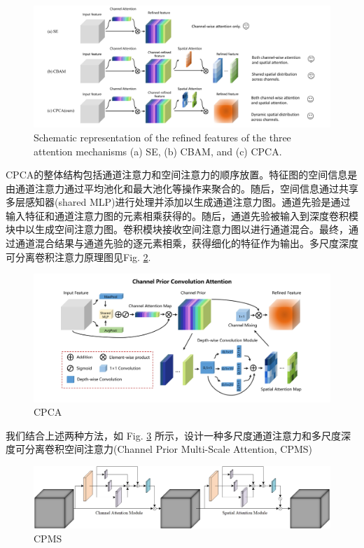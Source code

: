 \documentclass[a4paper]{ctexart}
\begin{document}
	 	\begin{figure}[htbp]
	 		\centering
	 		\includegraphics[width=0.8\linewidth]{picture/LLIE/Experiment/Attention/SE_CBAM_CPCA}
	 		\caption{Schematic representation of the refined features of the three attention mechanisms (a) SE, (b) CBAM, and (c) CPCA.}
	 		\label{fig: SE_CBAM_CPCA}
	 	\end{figure}
		 
		CPCA的整体结构包括通道注意力和空间注意力的顺序放置。特征图的空间信息是由通道注意力通过平均池化和最大池化等操作来聚合的。随后，空间信息通过共享多层感知器(shared MLP)进行处理并添加以生成通道注意力图。通道先验是通过输入特征和通道注意力图的元素相乘获得的。随后，通道先验被输入到深度卷积模块中以生成空间注意力图。卷积模块接收空间注意力图以进行通道混合。最终，通过通道混合结果与通道先验的逐元素相乘，获得细化的特征作为输出。多尺度深度可分离卷积注意力原理图见Fig. \ref{fig: CPCA}.
		
		\begin{figure}[htbp]
			\centering
			\includegraphics[width=0.8\linewidth]{picture/LLIE/Experiment/Attention/CPCA}
			\caption{CPCA}
			\label{fig: CPCA}
		\end{figure}
		
		我们结合上述两种方法，如 Fig. \ref{fig: CPMS} 所示，设计一种多尺度通道注意力和多尺度深度可分离卷积空间注意力(Channel Prior Multi-Scale Attention, CPMS)
		
		\begin{figure}[htbp]
			\centering
			\includegraphics[width=0.8\linewidth]{picture/LLIE/Experiment/Attention/CPMS}
			\caption{CPMS}
			\label{fig: CPMS}
		\end{figure}
		
\end{document}
